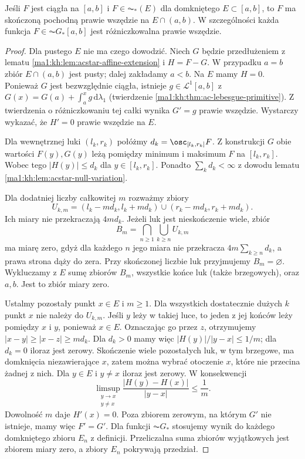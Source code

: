 \begin{twierdzenie}
\label{ma1:kh:thm:acstar-ae-differentiable}\label{it:thm:acstar-ae-differentiable}
Jeśli $F$ jest ciągła na $[a,b]$ i $F\in\AC_*(E)$ dla domkniętego $E\subset[a,b]$, to $F$ ma skończoną pochodną prawie wszędzie na $E\cap(a,b)$. W szczególności każda funkcja $F\in\AC G_*[a,b]$ jest różniczkowalna prawie wszędzie.
\end{twierdzenie}
\begin{proof}
Dla pustego $E$ nie ma czego dowodzić. Niech $G$ będzie przedłużeniem z lematu \ref{ma1:kh:lem:acstar-affine-extension} i $H=F-G$. W przypadku $a=b$ zbiór $E\cap(a,b)$ jest pusty; dalej zakładamy $a<b$. Na $E$ mamy $H=0$. Ponieważ $G$ jest bezwzględnie ciągła, istnieje $g\in\mathcal L^1[a,b]$ z $G(x)=G(a)+\int_a^x g\,\mathrm d\lambda_1$ (twierdzenie \ref{ma1:kh:thm:ac-lebesgue-primitive}). Z twierdzenia  o różniczkowaniu tej całki wynika $G'=g$ prawie wszędzie. Wystarczy wykazać, że $H'=0$ prawie wszędzie na $E$.

Dla wewnętrznej luki $(l_k,r_k)$ połóżmy $d_k=\osc_{[l_k,r_k]}F$. Z konstrukcji $G$ obie wartości $F(y),G(y)$ leżą pomiędzy minimum i maksimum $F$ na $[l_k,r_k]$. Wobec tego $|H(y)|\le d_k$ dla $y\in[l_k,r_k]$. Ponadto $\sum_k d_k<\infty$ z dowodu lematu \ref{ma1:kh:lem:acstar-null-variation}.

Dla dodatniej liczby całkowitej $m$ rozważmy zbiory
\[
 U_{k,m}=(l_k-md_k,l_k+md_k)\cup(r_k-md_k,r_k+md_k).
\]
Ich miary nie przekraczają $4md_k$. Jeżeli luk jest nieskończenie wiele, zbiór
\[
 B_m=\bigcap_{n\ge1}\bigcup_{k\ge n}U_{k,m}
\]
ma miarę zero, gdyż dla każdego $n$ jego miara nie przekracza $4m\sum_{k\ge n}d_k$, a prawa strona dąży do zera. Przy skończonej liczbie luk przyjmujemy $B_m=\varnothing$. Wykluczamy z $E$ sumę zbiorów $B_m$, wszystkie końce luk (także brzegowych), oraz $a,b$. Jest to zbiór miary zero.

Ustalmy pozostały punkt $x\in E$ i $m\ge1$. Dla wszystkich dostatecznie dużych $k$ punkt $x$ nie należy do $U_{k,m}$. Jeśli $y$ leży w takiej luce, to jeden z jej końców leży pomiędzy $x$ i $y$, ponieważ $x\in E$. Oznaczając go przez $z$, otrzymujemy $|x-y|\ge |x-z|\ge md_k$. Dla $d_k>0$ mamy więc $|H(y)|/|y-x|\le1/m$; dla $d_k=0$ iloraz jest zerowy. Skończenie wiele pozostałych luk, w tym brzegowe, ma domknięcia niezawierające $x$, zatem można wybrać otoczenie $x$, które nie przecina żadnej z nich. Dla $y\in E$ i $y\ne x$ iloraz jest zerowy. W konsekwencji
\[
 \limsup_{\substack{y\to x\\y\ne x}}
 \frac{|H(y)-H(x)|}{|y-x|}\le\frac1m.
\]
Dowolność $m$ daje $H'(x)=0$. Poza zbiorem zerowym, na którym $G'$ nie istnieje, mamy więc $F'=G'$. Dla funkcji $\AC G_*$ stosujemy wynik do każdego domkniętego zbioru $E_n$ z definicji. Przeliczalna suma zbiorów wyjątkowych jest zbiorem miary zero, a zbiory $E_n$ pokrywają przedział.
\end{proof}

